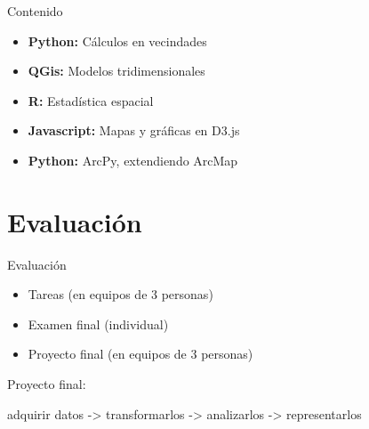 \documentclass[10pt]{beamer}
\begin{document}
\begin{frame}{Contenido}

  \begin{itemize}
  \item \textbf{Python:} Cálculos en vecindades 
  \item \textbf{QGis:} Modelos tridimensionales
  \item \textbf{R:} Estadística espacial
  \item \textbf{Javascript:} Mapas y gráficas en D3.js
  \item \textbf{Python:} ArcPy, extendiendo ArcMap
  \end{itemize}

\end{frame}


\section{Evaluación}

\begin{frame}{Evaluación}

  \begin{itemize}
  \item Tareas (en equipos de 3 personas)
  \item Examen final (individual)
  \item Proyecto final (en equipos de 3 personas)
  \end{itemize}\pause

  \begin{block}{}
    Proyecto final:

    adquirir datos -> transformarlos -> analizarlos -> representarlos
  \end{block}

\end{frame}
\end{document}
